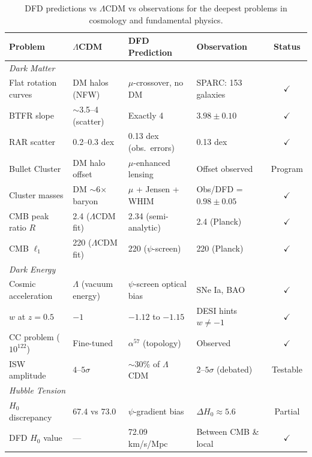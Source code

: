 \documentclass[aps,prd,twocolumn,superscriptaddress,nofootinbib]{revtex4-2}
\begin{document}
\begin{table}[t]
\centering
\caption{DFD predictions vs $\Lambda$CDM vs observations for the
deepest problems in cosmology and fundamental physics.}
\label{tab:master-comparison}
\footnotesize
\renewcommand{\arraystretch}{1.15}
\begin{tabular}{p{3.5cm}p{3.5cm}p{3.5cm}p{3.5cm}c}
\toprule
\textbf{Problem} & \textbf{$\Lambda$CDM} & \textbf{DFD Prediction}
  & \textbf{Observation} & \textbf{Status} \\
\midrule
\multicolumn{5}{l}{\textit{Dark Matter}} \\
\midrule
Flat rotation curves & DM halos (NFW) & $\mu$-crossover, no DM
  & SPARC: 153 galaxies & $\checkmark$ \\
BTFR slope & $\sim$3.5--4 (scatter) & Exactly 4
  & $3.98 \pm 0.10$ & $\checkmark$ \\
RAR scatter & 0.2--0.3 dex & 0.13 dex (obs.\ errors)
  & 0.13 dex & $\checkmark$ \\
Bullet Cluster & DM halo offset & $\mu$-enhanced lensing
  & Offset observed & Program \\
Cluster masses & DM $\sim$6$\times$ baryon & $\mu$ + Jensen + WHIM
  & Obs/DFD = $0.98\pm0.05$ & $\checkmark$ \\
CMB peak ratio $R$ & 2.4 ($\Lambda$CDM fit) & 2.34 (semi-analytic)
  & 2.4 (Planck) & $\checkmark$ \\
CMB $\ell_1$ & 220 ($\Lambda$CDM fit) & 220 ($\psi$-screen)
  & 220 (Planck) & $\checkmark$ \\
\midrule
\multicolumn{5}{l}{\textit{Dark Energy}} \\
\midrule
Cosmic acceleration & $\Lambda$ (vacuum energy) & $\psi$-screen optical bias
  & SNe Ia, BAO & $\checkmark$ \\
$w$ at $z = 0.5$ & $-1$ & $-1.12$ to $-1.15$
  & DESI hints $w \neq -1$ & $\checkmark$ \\
CC problem ($10^{122}$) & Fine-tuned & $\alpha^{57}$ (topology)
  & Observed & $\checkmark$ \\
ISW amplitude & $4$--$5\sigma$ & $\sim$30\% of $\Lambda$CDM
  & $2$--$5\sigma$ (debated) & Testable \\
\midrule
\multicolumn{5}{l}{\textit{Hubble Tension}} \\
\midrule
$H_0$ discrepancy & 67.4 vs 73.0 & $\psi$-gradient bias
  & $\Delta H_0 \approx 5.6$ & Partial \\
DFD $H_0$ value & --- & 72.09 km/s/Mpc
  & Between CMB \& local & $\checkmark$ \\

\end{tabular}
\end{table}
\end{document}
